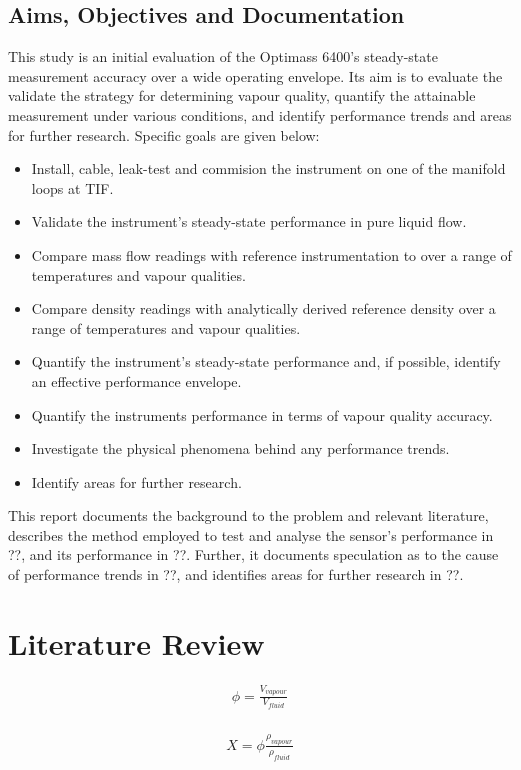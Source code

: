 \documentclass{report}
\begin{document}
\section{Aims, Objectives and Documentation}
This study is an initial evaluation of the Optimass 6400's steady-state measurement accuracy over a wide operating envelope. Its aim is to evaluate the validate the strategy for determining vapour quality, quantify the attainable measurement under various conditions, and identify performance trends and areas for further research. Specific goals are given below:
\begin{itemize}
\item{Install, cable, leak-test and commision the instrument on one of the manifold loops at TIF.}
\item{Validate the instrument's steady-state performance in pure liquid flow.}
\item{Compare mass flow readings with reference instrumentation to over a range of temperatures and vapour qualities.}
\item{Compare density readings with analytically derived reference density over a range of temperatures and vapour qualities.}
\item{Quantify the instrument's steady-state performance and, if possible, identify an effective performance envelope.}
\item{Quantify the instruments performance in terms of vapour quality accuracy.}
\item{Investigate the physical phenomena behind any performance trends.}
\item{Identify areas for further research.}
\end{itemize}
This report documents the background to the problem and relevant literature, describes the method employed to test and analyse the sensor's performance in ??, and its performance in ??. Further, it documents speculation as to the cause of performance trends in ??, and identifies areas for further research in ??.


\chapter{Literature Review}
\begin{eqnarray}
\phi =\frac{V_{vapour}}{V_{fluid}}
\end{eqnarray}\\
\begin{eqnarray}
X =\phi\frac{\rho_{vapour}}{\rho_{fluid}}
\end{eqnarray}
\end{document}
